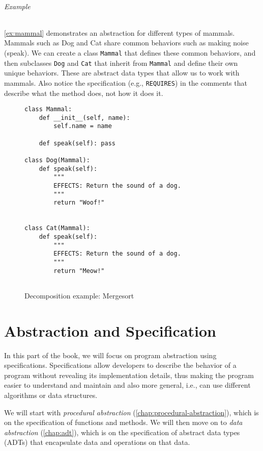 \documentclass[oneside,11pt,dvipsnames]{book}
\newcommand{\code}[1]{\texttt{#1}}
\begin{document}
\paragraph{Example} \autoref{ex:mammal} demonstrates an abstraction for different types of mammals. Mammals such as Dog and Cat share common behaviors such as making noise (speak). We can create a class \code{Mammal} that defines these common behaviors, and then subclasses \code{Dog} and \code{Cat} that inherit from \code{Mammal} and define their own unique behaviors.  These are abstract data types that allow us to work with mammals. Also notice the specification (e.g., \code{REQUIRES}) in the comments that describe what the method does, not how it does it.

\begin{figure}[t]
\begin{lstlisting}[multicols=2]
class Mammal:
    def __init__(self, name):
        self.name = name

    def speak(self): pass

class Dog(Mammal):
    def speak(self): 
        """
        EFFECTS: Return the sound of a dog.
        """
        return "Woof!"


class Cat(Mammal):
    def speak(self):
        """
        EFFECTS: Return the sound of a dog.
        """
        return "Meow!"
    

\end{lstlisting}
 \caption{Decomposition example: Mergesort}\label{ex:mammal}
\end{figure}

\part{Abstraction and Specification}

In this part of the book, we will focus on program abstraction using specifications. Specifications allow developers to describe the behavior of a program without revealing its implementation details, thus making the program easier to understand and maintain and also more general, i.e., can use different algorithms or data structures.

We will start with \emph{procedural abstraction} (\autoref{chap:procedural-abstraction}), which is on the specification of functions and methods. We will then move on to \emph{data abstraction} (\autoref{chap:adt}),  which is on the specification of abstract data types (ADTs) that encapsulate data and operations on that data.
\end{document}
